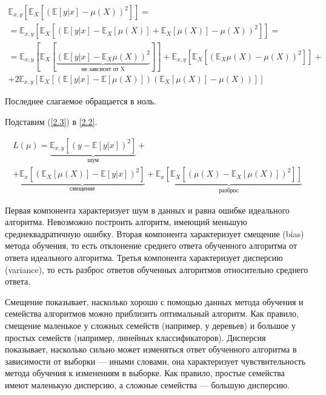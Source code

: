 \documentclass{article}
\theoremstyle{definition}
\theoremstyle{theorem}
\theoremstyle{remark}
\theoremstyle{theorem}
\theoremstyle{example}
\theoremstyle{theorem}
\theoremstyle{theorem}
\theoremstyle{theorem}
\theoremstyle{theorem}
\begin{document}
\begin{multline}
	\mathbb{E}_{x,y}\left[\mathbb{E}_X \left[(\mathbb{E}[y|x] - \mu(X))^2\right]\right] = \\ = \mathbb{E}_{x,y}\left[\mathbb{E}_X \left[(\mathbb{E}[y|x] - \mathbb{E}_X[\mu(X)] + \mathbb{E}_X[\mu(X)] -\mu(X))^2\right]\right] = \\ =
	\mathbb{E}_{x,y}\left[\mathbb{E}_X \left[\underbrace{(\mathbb{E}[y|x] - \mathbb{E}_X \mu(X))^2}_{\text{не завсисит от X}}\right]\right] + \mathbb{E}_{x,y}\left[\mathbb{E}_X \left[(\mathbb{E}_X \mu(X) - \mu(X))^2\right]\right] + \\ + 
	2\mathbb{E}_{x,y} \left[\mathbb{E}_X\left[(\mathbb{E}[y|x] - \mathbb{E}[\mu(X)])(\mathbb{E}_X[\mu(X)]-\mu(X))\right]\right]
	\label{2.3}
\end{multline}

Последнее слагаемое обращается в ноль.

Подставим (\ref{2.3}) в \ref{2.2}.

\begin{multline}
	L(\mu) = \underbrace{\mathbb{E}_{x,y}\left[(y-\mathbb{E}[y|x])^2\right]}_{\text{шум}} + \\ +
	\underbrace{\mathbb{E}_x\left[\left(\mathbb{E}_X[\mu(X)] - \mathbb{E}[y|x]\right)^2\right]}_{\text{смещение}} + \underbrace{\mathbb{E}_x\left[\mathbb{E}_X\left[(\mu(X) - \mathbb{E}_X[\mu(X)])^2\right]\right]}_{\text{разброс}}
	\label{2.4}
\end{multline}

Первая компонента характеризует шум в данных и равна ошибке идеального алгоритма. Невозможно построить алгоритм, имеющий меньшую среднеквадратичную ошибку. Вторая компонента характеризует смещение (bias) метода обучения, то есть отклонение среднего ответа обученного алгоритма от ответа идеального алгоритма. Третья компонента характеризует дисперсию (variance), то есть разброс ответов обученных алгоритмов относительно среднего ответа. 

Смещение показывает, насколько хорошо с помощью данных метода обучения и семейства алгоритмов можно приблизить оптимальный алгоритм. Как правило, смещение маленькое у сложных семейств (например, у деревьев) и большое у простых семейств (например, линейных классификаторов). Дисперсия показывает, насколько сильно может изменяться ответ обученного алгоритма в зависимости от выборки --- иными словами, она характеризует чувствительность метода обучения к изменениям в выборке. Как правило, простые семейства имеют маленькую дисперсию, а сложные семейства --- большую дисперсию.
\end{document}
